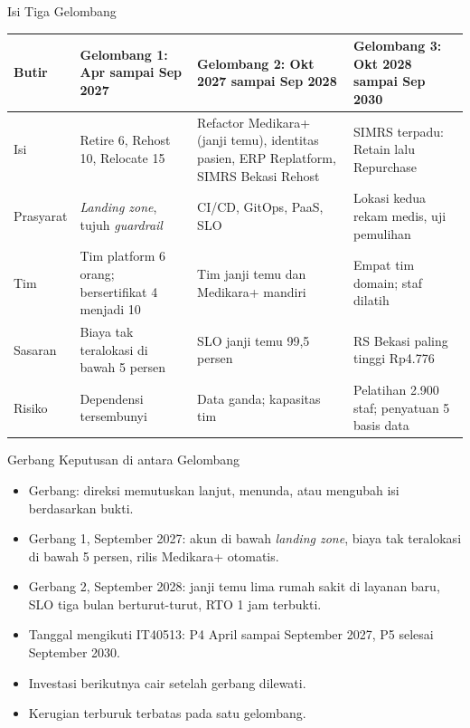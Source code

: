 \documentclass[aspectratio=169, table, 12pt]{beamer}
\begin{document}
\begin{frame}{{\Large Isi Tiga Gelombang}}
  \footnotesize
  \begin{tabularx}{\textwidth}{>{\raggedright\arraybackslash}p{1.6cm}
      >{\raggedright\arraybackslash}X >{\raggedright\arraybackslash}X
      >{\raggedright\arraybackslash}X}
    \hline
    \textbf{Butir} & \textbf{Gelombang 1: Apr sampai Sep 2027} & \textbf{Gelombang 2: Okt 2027
      sampai Sep 2028} & \textbf{Gelombang 3: Okt 2028 sampai Sep 2030} \\ \hline
    Isi & Retire 6, Rehost 10, Relocate 15 & Refactor Medikara+ (janji temu), identitas pasien, ERP
      Replatform, SIMRS Bekasi Rehost & SIMRS terpadu: Retain lalu Repurchase \\ \hline
    Prasyarat & \textit{Landing zone}, tujuh \textit{guardrail} & CI/CD, GitOps, PaaS, SLO &
      Lokasi kedua rekam medis, uji pemulihan \\ \hline
    Tim & Tim platform 6 orang; bersertifikat 4 menjadi 10 & Tim janji temu dan Medikara+ mandiri &
      Empat tim domain; staf dilatih \\ \hline
    Sasaran & Biaya tak teralokasi di bawah 5 persen & SLO janji temu 99,5 persen & RS Bekasi
      paling tinggi Rp4.776 \\ \hline
    Risiko & Dependensi tersembunyi & Data ganda; kapasitas tim & Pelatihan 2.900 staf; penyatuan 5
      basis data \\ \hline
  \end{tabularx}
\end{frame}

\begin{frame}{{\Large Gerbang Keputusan di antara Gelombang}}
  \vspace{10pt}
  \begin{itemize}
    \item Gerbang: direksi memutuskan lanjut, menunda, atau mengubah isi berdasarkan bukti.
    \item Gerbang 1, September 2027: akun di bawah \textit{landing zone}, biaya tak teralokasi di
          bawah 5 persen, rilis Medikara+ otomatis.
    \item Gerbang 2, September 2028: janji temu lima rumah sakit di layanan baru, SLO tiga bulan
          berturut-turut, RTO 1 jam terbukti.
    \item Tanggal mengikuti IT40513: P4 April sampai September 2027, P5 selesai September 2030.
    \item Investasi berikutnya cair setelah gerbang dilewati.
    \item Kerugian terburuk terbatas pada satu gelombang.
  \end{itemize}
\end{frame}
\end{document}
